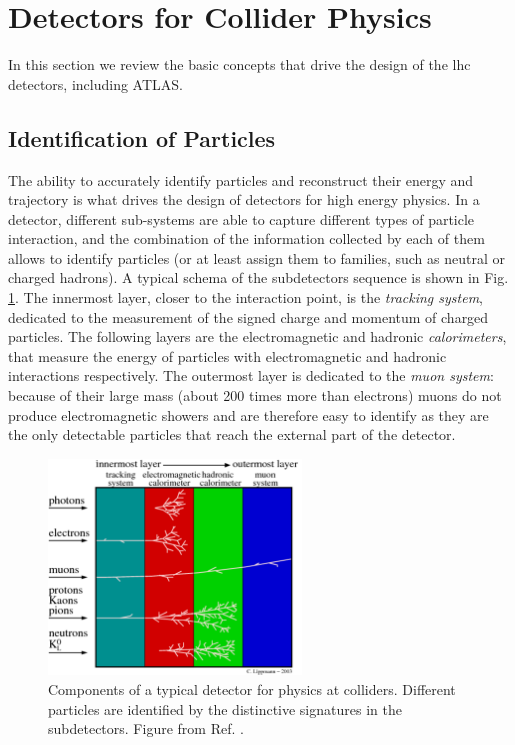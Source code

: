 \section{Detectors for Collider Physics}
\label{sec:detectors}

In this section we review the basic concepts that drive the design of the \gls{lhc} detectors, including ATLAS.

\subsection{Identification of Particles}
\label{sec:detectors:identification}



The ability to accurately identify particles and reconstruct their energy and trajectory is what drives the design of detectors for high energy physics. In a detector, different sub-systems are able to capture different types of particle interaction, and the combination of the information collected by each of them allows to identify particles (or at least assign them to families, such as neutral or charged hadrons). A typical schema of the subdetectors sequence is shown in Fig. \ref{fig:detector:interaction}. The innermost layer, closer to the interaction point, is the \textit{tracking system}, dedicated to the measurement of the signed charge and momentum of charged particles. The following layers are the electromagnetic and hadronic \textit{calorimeters}, that measure the energy of particles with electromagnetic and hadronic interactions respectively. The outermost layer is dedicated to the \textit{muon system}: because of their large mass (about 200 times more than electrons) muons do not produce electromagnetic showers and are therefore easy to identify as they are the only detectable particles that reach the external part of the detector.

\begin{figure}[ht]
\centering
\includegraphics[width=0.6\textwidth]{figures/detector/particles_in_detector}
\caption{Components of a typical detector for physics at colliders. Different particles are identified by the distinctive signatures in the subdetectors. Figure from Ref. \cite{Lippmann:2011bb}.}
\label{fig:detector:interaction}
\end{figure}



